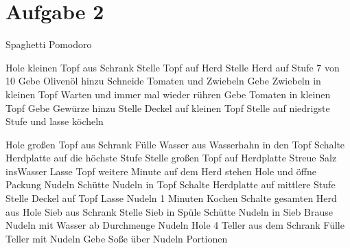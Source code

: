 \documentclass{scrartcl}
\begin{document}
\section*{Aufgabe 2}
\begin{algorithm}
	\caption{Spaghetti Pomodoro}
	\begin{algorithmic} [1]
		\State Hole kleinen Topf aus Schrank
		\State  Stelle Topf auf Herd
		\State  Stelle Herd auf Stufe 7 von 10
		\State   Gebe Olivenöl hinzu
		\State Schneide Tomaten und Zwiebeln
		\EndWhile
		\State  Gebe Zwiebeln in kleinen Topf
		\State Warten und immer mal wieder rühren
		\EndWhile
		\State  Gebe Tomaten in kleinen Topf
		\State  Gebe Gewürze hinzu
		\State  Stelle Deckel auf kleinen Topf
		\State  Stelle auf niedrigste Stufe und lasse köcheln
	\end{algorithmic}

	\begin{algorithmic} [1]
		\State Hole großen Topf aus Schrank
		\State Fülle Wasser aus Wasserhahn in den Topf
		\EndWhile
		\State  Schalte Herdplatte auf die höchste Stufe
		\State Stelle großen Topf auf Herdplatte
		\State Streue Salz insWasser
		\State Lasse Topf weitere Minute auf dem Herd stehen
		\EndWhile
		\State Hole und öffne Packung Nudeln
		\State Schütte Nudeln in Topf
		\State Schalte Herdplatte auf mittlere Stufe
		\State Stelle Deckel auf Topf
		\State Lasse Nudeln 1 Minuten Kochen
		\EndWhile
		\State Schalte gesamten Herd aus
		\State Hole Sieb aus Schrank
		\State Stelle Sieb in Spüle
		\State Schütte Nudeln in Sieb
		\State Brause Nudeln mit Wasser ab
		\State Durchmenge Nudeln
		\EndIf
		\State Hole 4 Teller aus dem Schrank
		\State Fülle Teller mit Nudeln
		\State Gebe Soße über Nudeln
		\EndWhile
		\Return Portionen
	\end{algorithmic}

\end{algorithm}
\end{document}
